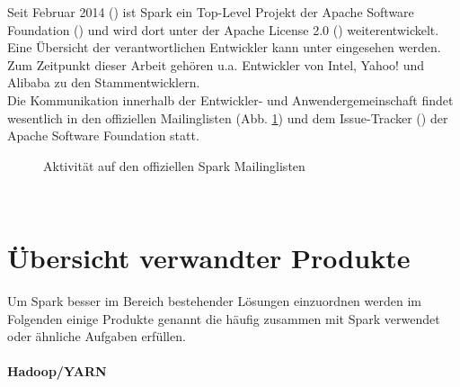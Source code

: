 Seit Februar 2014 (\cite{apacheblog}) ist Spark ein Top-Level Projekt der Apache Software Foundation (\cite{apache}) und wird dort unter der Apache License 2.0 (\cite{apachelic}) weiterentwickelt.\\

Eine Übersicht der verantwortlichen Entwickler kann unter \cite{committer} eingesehen werden.
Zum Zeitpunkt dieser Arbeit gehören u.a. Entwickler von Intel, Yahoo! und Alibaba zu den Stammentwicklern.\\

Die Kommunikation innerhalb der Entwickler- und Anwendergemeinschaft findet wesentlich in den offiziellen Mailinglisten (Abb. \ref{fig:mailinglisten}) und dem Issue-Tracker (\cite{issuetracker}) der Apache Software Foundation statt.

\begin{figure}[ht!]
	\centering
	\caption{Aktivität auf den offiziellen Spark Mailinglisten}
	\label{fig:mailinglisten}
\end{figure}
\\

\section{Übersicht verwandter Produkte}
Um Spark besser im Bereich bestehender Lösungen einzuordnen werden im Folgenden einige Produkte genannt die häufig zusammen mit Spark verwendet oder ähnliche Aufgaben erfüllen.

\paragraph{Hadoop/YARN}\\

